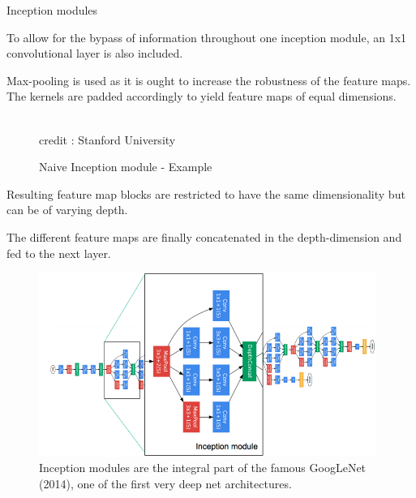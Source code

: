 \begin{vbframe}{Inception modules}
\begin{figure}
    \end{figure}
    \begin{itemize}
        \item \small{To allow for the bypass of information throughout one inception module, an 1x1 convolutional layer is also included.
        \item Max-pooling is used as it is ought to increase the robustness of the feature maps. The kernels are padded accordingly to yield feature maps of equal dimensions.}
    \end{itemize}
\framebreak

    \begin{figure}
      \centering
      \tiny{\\ credit : Stanford University}
      \caption{\footnotesize{Naive Inception module - Example}}
    \end{figure}
    \begin{itemize}
        \item \small{Resulting feature map blocks are restricted to have the same dimensionality but can be of varying depth.
        \item The different feature maps are finally concatenated in the depth-dimension and fed to the next layer.}
    \end{itemize}
\framebreak

    \begin{figure}
        \centering
        \includegraphics[width=11cm]{plots/05_conv_variations/inception/googlenet.png}
        \caption{Inception modules are the integral part of the famous GoogLeNet (2014), one of the first very deep net architectures.}
    \end{figure}
\end{vbframe}

